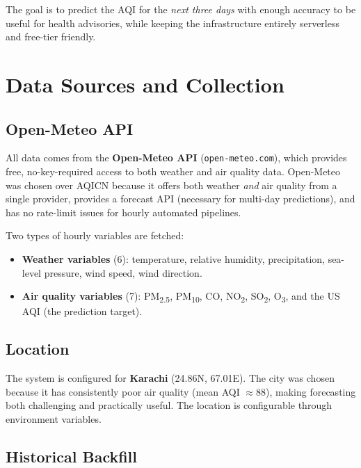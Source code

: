 \documentclass[12pt, a4paper]{article}
\begin{document}
The goal is to predict the AQI for the \emph{next three days} with enough accuracy to be useful for health advisories, while keeping the infrastructure entirely serverless and free-tier friendly.


\section{Data Sources and Collection}

\subsection{Open-Meteo API}

All data comes from the \textbf{Open-Meteo API} (\texttt{open-meteo.com}), which provides free, no-key-required access to both weather and air quality data.  Open-Meteo was chosen over AQICN because it offers both weather \emph{and} air quality from a single provider, provides a forecast API (necessary for multi-day predictions), and has no rate-limit issues for hourly automated pipelines.

Two types of hourly variables are fetched:

\begin{itemize}
  \item \textbf{Weather variables} (6): temperature, relative humidity, precipitation, sea-level pressure, wind speed, wind direction.
  \item \textbf{Air quality variables} (7): PM\textsubscript{2.5}, PM\textsubscript{10}, CO, NO\textsubscript{2}, SO\textsubscript{2}, O\textsubscript{3}, and the US AQI (the prediction target).
\end{itemize}

\subsection{Location}

The system is configured for \textbf{Karachi} (24.86\textdegree N, 67.01\textdegree E).  The city was chosen because it has consistently poor air quality (mean AQI $\approx 88$), making forecasting both challenging and practically useful.  The location is configurable through environment variables.

\subsection{Historical Backfill}
\end{document}
